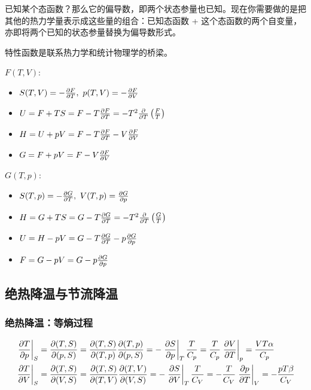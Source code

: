 已知某个态函数？那么它的偏导数，即两个状态参量也已知。现在你需要做的是把其他的热力学量表示成这些量的组合：已知态函数 + 这个态函数的两个自变量，亦即将两个已知的状态参量替换为偏导数形式。

特性函数是联系热力学和统计物理学的桥梁。

\begin{multicols}{2}
    $F(T, V)$:
    \begin{itemize}
        \item $S(T, V) = -\pdv{F}{T},\ p(T, V) = - \pdv{F}{V}$
        \item $U = F + T S = F - T \pdv{F}{T} = - T^2 \pdv{}{T} \left(\frac{F}{T}\right)$
        \item $H = U + p V = F - T \pdv{F}{T} - V \pdv{F}{V}$
        \item $G = F + p V = F - V \pdv{F}{V}$
    \end{itemize}
    $G(T, p)$:
    \begin{itemize}
        \item $S(T, p) = - \pdv{G}{T},\ V(T, p) = \pdv{G}{p}$
        \item $H = G + T S = G - T \pdv{G}{T} = - T^2 \pdv{}{T} \left(\frac{G}{T}\right)$
        \item $U = H - p V = G - T \pdv{G}{T} - p \pdv{G}{p}$
        \item $F = G - p V = G - p \pdv{G}{p}$
    \end{itemize}
\end{multicols}

\subsection{绝热降温与节流降温}

\subsubsection{绝热降温：等熵过程}

\begin{align*}
    \left.\pdv{T}{p}\right|_S & = \pdv{(T, S)}{(p, S)} = \pdv{(T, S)}{(T, p)} \pdv{(T, p)}{(p, S)} = -\left.\pdv{S}{p}\right|_T \frac{T}{C_p} = \frac{T}{C_p} \left.\pdv{V}{T}\right|_p = \frac{V T \alpha}{C_p}     \\
    \left.\pdv{T}{V}\right|_S & = \pdv{(T, S)}{(V, S)} = \pdv{(T, S)}{(T, V)} \pdv{(T, V)}{(V, S)} = - \left.\pdv{S}{V}\right|_T \frac{T}{C_V} = - \frac{T}{C_V} \left.\pdv{p}{T}\right|_V = - \frac{p T \beta}{C_V}
\end{align*}

